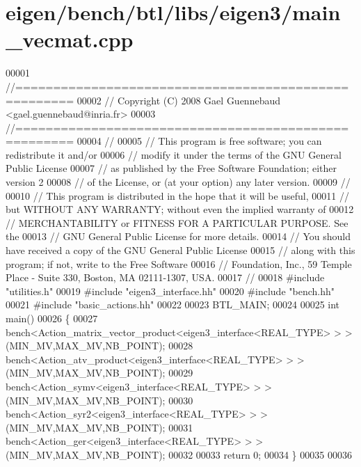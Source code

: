 \hypertarget{eigen_2bench_2btl_2libs_2eigen3_2main__vecmat_8cpp_source}{}\section{eigen/bench/btl/libs/eigen3/main\+\_\+vecmat.cpp}
\label{eigen_2bench_2btl_2libs_2eigen3_2main__vecmat_8cpp_source}

\begin{DoxyCode}
00001 \textcolor{comment}{//=====================================================}
00002 \textcolor{comment}{// Copyright (C) 2008 Gael Guennebaud <gael.guennebaud@inria.fr>}
00003 \textcolor{comment}{//=====================================================}
00004 \textcolor{comment}{//}
00005 \textcolor{comment}{// This program is free software; you can redistribute it and/or}
00006 \textcolor{comment}{// modify it under the terms of the GNU General Public License}
00007 \textcolor{comment}{// as published by the Free Software Foundation; either version 2}
00008 \textcolor{comment}{// of the License, or (at your option) any later version.}
00009 \textcolor{comment}{//}
00010 \textcolor{comment}{// This program is distributed in the hope that it will be useful,}
00011 \textcolor{comment}{// but WITHOUT ANY WARRANTY; without even the implied warranty of}
00012 \textcolor{comment}{// MERCHANTABILITY or FITNESS FOR A PARTICULAR PURPOSE.  See the}
00013 \textcolor{comment}{// GNU General Public License for more details.}
00014 \textcolor{comment}{// You should have received a copy of the GNU General Public License}
00015 \textcolor{comment}{// along with this program; if not, write to the Free Software}
00016 \textcolor{comment}{// Foundation, Inc., 59 Temple Place - Suite 330, Boston, MA  02111-1307, USA.}
00017 \textcolor{comment}{//}
00018 \textcolor{preprocessor}{#include "utilities.h"}
00019 \textcolor{preprocessor}{#include "eigen3\_interface.hh"}
00020 \textcolor{preprocessor}{#include "bench.hh"}
00021 \textcolor{preprocessor}{#include "basic\_actions.hh"}
00022 
00023 BTL\_MAIN;
00024 
00025 \textcolor{keywordtype}{int} main()
00026 \{
00027   bench<Action\_matrix\_vector\_product<eigen3\_interface<REAL\_TYPE> > >(MIN\_MV,MAX\_MV,NB\_POINT);
00028   bench<Action\_atv\_product<eigen3\_interface<REAL\_TYPE> > >(MIN\_MV,MAX\_MV,NB\_POINT);
00029   bench<Action\_symv<eigen3\_interface<REAL\_TYPE> > >(MIN\_MV,MAX\_MV,NB\_POINT);
00030   bench<Action\_syr2<eigen3\_interface<REAL\_TYPE> > >(MIN\_MV,MAX\_MV,NB\_POINT);
00031   bench<Action\_ger<eigen3\_interface<REAL\_TYPE> > >(MIN\_MV,MAX\_MV,NB\_POINT);
00032 
00033   \textcolor{keywordflow}{return} 0;
00034 \}
00035 
00036 
\end{DoxyCode}
